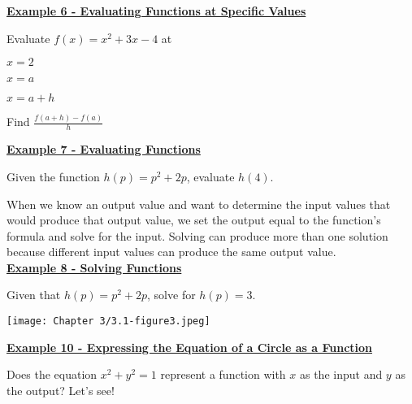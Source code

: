 \documentclass[12pt]{book}
\newcommand{\D}{\displaystyle}
\begin{document}
\underline{\textbf{Example 6 - Evaluating Functions at Specific Values}}

Evaluate $f(x)=x^2+3x-4$ at
    \begin{enumerate}[(a)]
    \begin{multicols}{2}
        \item $x=2$
        \item $x=a$
    \end{multicols}
    \vspace{35mm}
    \begin{multicols}{2}
         \item $x=a+h$
     \vspace{30mm}
    \item Find $\D \frac{f(a+h)-f(a)}{h}$
     \vspace{30mm}
    \end{multicols}
   
    \end{enumerate}

\vspace{35mm}



\newpage

\underline{\textbf{Example 7 - Evaluating Functions}}

Given the function $h(p)=p^2+2p$, evaluate $h(4)$.

\vspace{25mm}

When we know an output value and want to determine the input values that would produce that output value, we set the output equal to the function’s formula and solve for the input. Solving can produce more than one solution because different input values can produce the same output value.
\\

\underline{\textbf{Example 8 - Solving Functions}}

Given that $h(p)=p^2 +2p$, solve for $h(p)=3$.

\vspace{70mm}
\texttt{[image: Chapter 3/3.1-figure3.jpeg]}
\newpage


\underline{\textbf{Example 10 - Expressing the Equation of a Circle as a Function}}

Does the equation $x^2 + y^2 = 1$ represent a function with $x$ as the input and $y$ as the output? Let's see!

\vspace{45mm}
\end{document}
